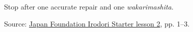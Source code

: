 \begin{tcolorbox}[breakable,colback=teal!4,colframe=teal!35!black,title={Before you move on}]
Stop after one accurate repair and one \emph{wakarimashita}.

Source: \href{https://www.irodori.jpf.go.jp/assets/data/starter/pdf/X\_L02.pdf}{Japan Foundation Irodori Starter lesson 2}, pp. 1–3.
\end{tcolorbox}

